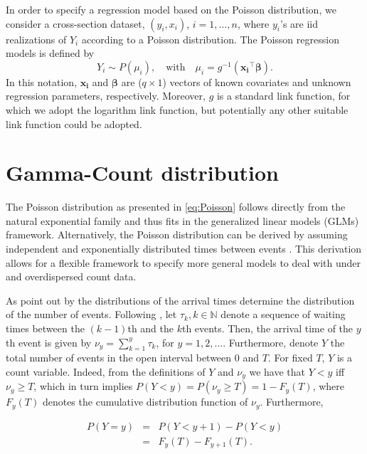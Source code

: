 \documentclass[9pt,a5paper,]{book}
\theoremstyle{definition}
\theoremstyle{definition}
\theoremstyle{remark}
\begin{document}
In order to specify a regression model based on the Poisson
distribution, we consider a cross-section dataset, \((y_i, x_i)\),
\(i = 1,\ldots, n\), where \(y_i\)'s are iid realizations of \(Y_i\)
according to a Poisson distribution. The Poisson regression models is
defined by
\[Y_i \sim P(\mu_i), \quad  \text{with} \quad \mu_i = g^{-1}(\boldsymbol{x_i}^{\top} \boldsymbol{\beta}).\]
In this notation, \(\boldsymbol{x_i}\) and \(\boldsymbol{\beta}\) are
(\(q \times 1\)) vectors of known covariates and unknown regression
parameters, respectively. Moreover, \(g\) is a standard link function,
for which we adopt the logarithm link function, but potentially any
other suitable link function could be adopted.

\section{Gamma-Count distribution}\label{gammacount}

The Poisson distribution as presented in \eqref{eq:Poisson} follows
directly from the natural exponential family and thus fits in the
generalized linear models (GLMs) framework. Alternatively, the Poisson
distribution can be derived by assuming independent and exponentially
distributed times between events \citep{Zeviani2014}. This derivation
allows for a flexible framework to specify more general models to deal
with under and overdispersed count data.

As point out by \citet{Winkelmann2003} the distributions of the arrival
times determine the distribution of the number of events. Following
\citet{Winkelman1995}, let \({\tau_k, k \in \mathbb{N}}\) denote a
sequence of waiting times between the \((k-1)\)th and the \(k\)th
events. Then, the arrival time of the \(y\)th event is given by
\(\nu_y = \sum_{k = 1}^{y} \tau_k\), for \(y = 1, 2, \ldots\).
Furthermore, denote \(Y\) the total number of events in the open
interval between \(0\) and \(T\). For fixed \(T\), \(Y\) is a count
variable. Indeed, from the definitions of \(Y\) and \(\nu_y\) we have
that \(Y < y\) iff \(\nu_y \ge T\), which in turn implies
\(P(Y < y) = P(\nu_y \ge T) = 1 - F_y(T)\), where \(F_y(T)\) denotes the
cumulative distribution function of \(\nu_y\). Furthermore,

\begin{eqnarray}
P(Y = y) &=& P(Y < y+1) - P(Y < y) \nonumber \\
     &=& F_y(T) - F_{y+1}(T).
\label{eq:DURATION}
\end{eqnarray}
\end{document}

